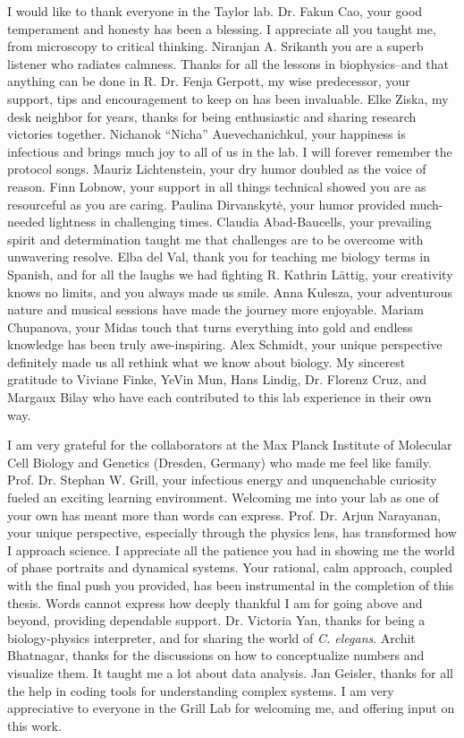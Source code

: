 I would like to thank everyone in the Taylor lab. Dr. Fakun Cao, your good temperament and honesty has been a blessing. I appreciate all you taught me, from microscopy to critical thinking. Niranjan A. Srikanth you are a superb listener who radiates calmness. Thanks for all the lessons in biophysics--and that anything can be done in R. Dr. Fenja Gerpott, my wise predecessor, your support, tips and encouragement to keep on has been invaluable. Elke Ziska, my desk neighbor for years, thanks for being enthusiastic and sharing research victories together. Nichanok “Nicha” Auevechanichkul, your happiness is infectious and brings much joy to all of us in the lab. I will forever remember the protocol songs. Mauriz Lichtenstein, your dry humor doubled as the voice of reason. Finn Lobnow, your support in all things technical showed you are as resourceful as you are caring. Paulina Dirvanskytė, your humor provided much-needed lightness in challenging times. Claudia Abad-Baucells, your prevailing spirit and determination taught me that challenges are to be overcome with unwavering resolve. Elba del Val, thank you for teaching me biology terms in Spanish, and for all the laughs we had fighting R. Kathrin Lättig, your creativity knows no limits, and you always made us smile. Anna Kulesza, your adventurous nature and musical sessions have made the journey more enjoyable. Mariam Chupanova, your Midas touch that turns everything into gold and endless knowledge has been truly awe-inspiring. Alex Schmidt, your unique perspective definitely made us all rethink what we know about biology. My sincerest gratitude to Viviane Finke, YeVin Mun, Hans Lindig, Dr. Florenz Cruz, and Margaux Bilay who have each contributed to this lab experience in their own way.

I am very grateful for the collaborators at the Max Planck Institute of Molecular Cell Biology and Genetics (Dresden, Germany) who made me feel like family. Prof. Dr. Stephan W. Grill, your infectious energy and unquenchable curiosity fueled an exciting learning environment. Welcoming me into your lab as one of your own has meant more than words can express. Prof. Dr. Arjun Narayanan, your unique perspective, especially through the physics lens, has transformed how I approach science. I appreciate all the patience you had in showing me the world of phase portraits and dynamical systems. Your rational, calm approach, coupled with the final push you provided, has been instrumental in the completion of this thesis. Words cannot express how deeply thankful I am for going above and beyond, providing dependable support. Dr. Victoria Yan, thanks for being a biology-physics interpreter, and for sharing the world of \emph{C. elegans}. Archit Bhatnagar, thanks for the discussions on how to conceptualize numbers and visualize them. It taught me a lot about data analysis. Jan Geisler, thanks for all the help in coding tools for understanding complex systems. I am very appreciative to everyone in the Grill Lab for welcoming me, and offering input on this work.

